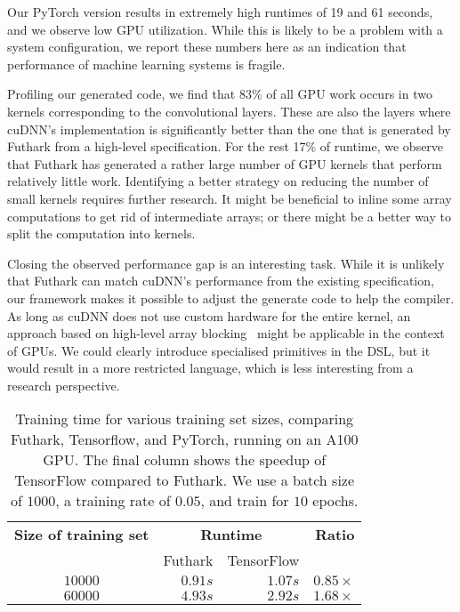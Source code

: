 Our PyTorch version results in extremely high runtimes of 19 and 61
seconds, and we observe low GPU utilization. While this is likely to
be a problem with a system configuration, we report these numbers here
as an indication that performance of machine learning systems is
fragile.

Profiling our generated code, we find that 83\% of all GPU work occurs
in two kernels corresponding to the convolutional layers. These are also the layers
where cuDNN's implementation is significantly better than the one
that is generated by Futhark from a high-level specification.
For the rest 17\% of runtime, we observe that Futhark has
generated a rather large number of GPU kernels that perform relatively
little work.  Identifying a better strategy on reducing the number
of small kernels requires further research.  It might be beneficial to
inline some array computations to get rid of intermediate arrays;
or there might be a better way to split the computation into kernels.

Closing the observed performance gap is an interesting task.
While it is unlikely that Futhark can match cuDNN's performance
from the existing specification, our framework makes it possible
to adjust the generate code to help the compiler.  As long as cuDNN
does not use custom hardware for the entire kernel, an approach
based on high-level array blocking~\cite{rp-mm} might be applicable
in the context of GPUs.  We could clearly introduce specialised
primitives in the DSL, but it would result in a more
restricted language, which is less interesting from a research
perspective.

\begin{table}
\begin{tabular}{crrr}
\textbf{Size of training set} & \multicolumn{2}{c}{\textbf{Runtime}} & \textbf{Ratio} \\
& Futhark & TensorFlow & \\
$10000$ & $0.91s$ & $1.07s$ &  $0.85\times{}$ \\
$60000$ & $4.93s$ & $2.92s$ &  $1.68\times{}$
\end{tabular}
\caption{Training time for various training set sizes, comparing
  Futhark, Tensorflow, and PyTorch, running on an A100 GPU. The final column
  shows the speedup of TensorFlow compared to Futhark. We use a batch
  size of $1000$, a training rate of $0.05$, and train for $10$
  epochs.}
\label{tab:performance}
\end{table}

%
